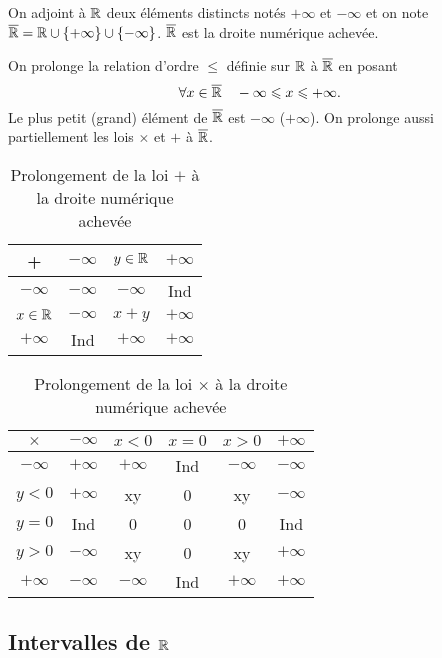   \begin{defdef}
  On adjoint à \(\mathbb{R}\) deux éléments distincts notés \( + \infty\) et \( - 
\infty\) et on note \(\overline{\mathbb{R}} = \mathbb{R}\cup\{ + \infty\}\cup\{ - \infty\}\).  
\(\overline{\mathbb{R}}\) est la droite numérique achevée.  \end{defdef}
On prolonge la relation d'ordre \(\leqslant\) définie sur \(\mathbb{R}\) à \(\overline{\mathbb{R}}\) 
en posant
\begin{equation}
  \forall x\in \overline{\mathbb{R}} \quad -\infty\leqslant x\leqslant +\infty.
\end{equation}
Le plus petit (grand) élément de \(\overline{\mathbb{R}}\) est \( - \infty\) (\( + \infty\)).  
On prolonge aussi partiellement les lois \(\times\) et \( + \) à \(\overline{\mathbb{R}}\).
\begin{table}[!h]
  \centering
  \begin{tabular}{|c|c|c|c|}\hline
    + & \( - \infty\) & \(y\in\mathbb{R}\) & \( + \infty\) \\ \hline
    \( - \infty\) & \( - \infty\) & \( - \infty\)& Ind \\ \hline
    \(x\in\mathbb{R}\) & \( - \infty\) & \(x + y\) & \( + \infty\) \\ \hline
  \( + \infty\) & Ind & \( + \infty\) & \( + \infty\) \\ \hline \end{tabular}
  \caption{Prolongement de la loi \( + \) à la droite numérique achevée}
\end{table}
\begin{table}[!h]
  \centering
  \begin{tabular}{|c|c|c|c|c|c|}\hline
    \(\times\) & \( - \infty\) & \(x<0\) & \(x = 0\) & \(x>0\) & \( + \infty\) 
    \\ \hline
    \( - \infty\) & \( + \infty\)& \( + \infty\)& Ind& \( - \infty\)& \( - 
    \infty\)\\ \hline
    \(y<0\) &\( + \infty\) & xy& 0& xy& \( - \infty\)\\ \hline
    \(y = 0\) & Ind& 0& 0& 0&Ind \\ \hline
    \(y>0\) & \( - \infty\)& xy& 0& xy& \( + \infty\)\\ \hline
  \( + \infty\) & \( - \infty\)& \( - \infty\)& Ind& \( + \infty\) & \( + 
\infty\)\\ \hline \end{tabular}
\caption{Prolongement de la loi \(\times\) à la droite numérique achevée}
\end{table}

\subsection{Intervalles de \(\mathbb{R}\)}

